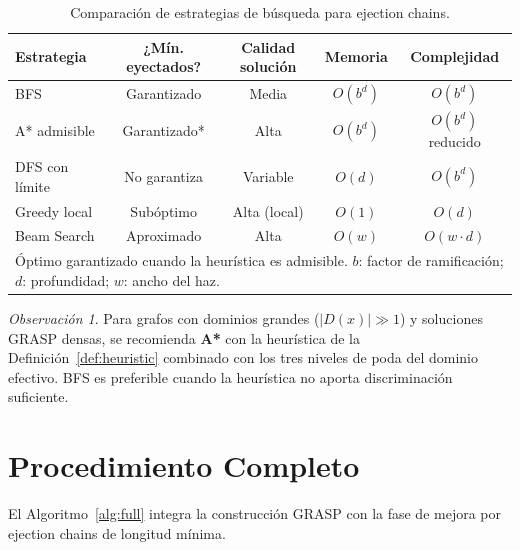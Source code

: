 \documentclass[12pt, a4paper]{article}
\theoremstyle{definition}
\theoremstyle{plain}
\theoremstyle{remark}
\newtheorem{remark}{Observación}[section]
\newcommand{\dom}[1]{D\!\left(#1\right)}
\begin{document}
\begin{table}[H]
\centering
\caption{Comparación de estrategias de búsqueda para ejection chains.}
\label{tab:comparison}
\renewcommand{\arraystretch}{1.3}
\begin{tabular}{lcccc}
\toprule
\textbf{Estrategia} &
\textbf{¿Mín. eyectados?} &
\textbf{Calidad solución} &
\textbf{Memoria} &
\textbf{Complejidad} \\
\midrule
BFS               & Garantizado  & Media        & $O(b^d)$    & $O(b^d)$          \\
A* admisible      & Garantizado* & Alta         & $O(b^d)$    & $O(b^d)$ reducido \\
DFS con límite    & No garantiza & Variable     & $O(d)$      & $O(b^d)$          \\
Greedy local      & Subóptimo    & Alta (local) & $O(1)$      & $O(d)$            \\
Beam Search       & Aproximado   & Alta         & $O(w)$      & $O(w \cdot d)$    \\
\bottomrule
\multicolumn{5}{l}{\small *Óptimo garantizado cuando la heurística es
admisible.  $b$: factor de ramificación; $d$: profundidad; $w$: ancho del haz.}
\end{tabular}
\end{table}

\begin{remark}
  Para grafos con dominios grandes ($|\dom{x}| \gg 1$) y soluciones GRASP
  densas, se recomienda \textbf{A*} con la heurística de la
  Definición~\ref{def:heuristic} combinado con los tres niveles de poda del
  dominio efectivo.  BFS es preferible cuando la heurística no aporta
  discriminación suficiente.
\end{remark}

\section{Procedimiento Completo}

El Algoritmo~\ref{alg:full} integra la construcción GRASP con la fase de
mejora por ejection chains de longitud mínima.
\end{document}
